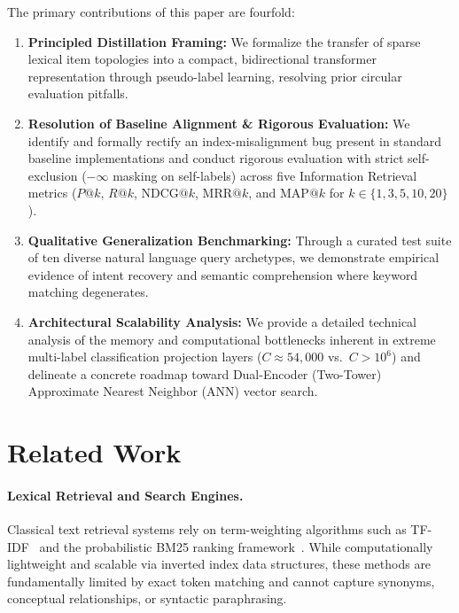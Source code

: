 \documentclass[11pt]{article}
\begin{document}
The primary contributions of this paper are fourfold:
\begin{enumerate}
  \item \textbf{Principled Distillation Framing:} We formalize the transfer of sparse lexical item topologies into a compact, bidirectional transformer representation through pseudo-label learning, resolving prior circular evaluation pitfalls.
  \item \textbf{Resolution of Baseline Alignment \& Rigorous Evaluation:} We identify and formally rectify an index-misalignment bug present in standard baseline implementations and conduct rigorous evaluation with strict self-exclusion ($-\infty$ masking on self-labels) across five Information Retrieval metrics ($P@k$, $R@k$, $\text{NDCG}@k$, $\text{MRR}@k$, and $\text{MAP}@k$ for $k \in \{1, 3, 5, 10, 20\}$).
  \item \textbf{Qualitative Generalization Benchmarking:} Through a curated test suite of ten diverse natural language query archetypes, we demonstrate empirical evidence of intent recovery and semantic comprehension where keyword matching degenerates.
  \item \textbf{Architectural Scalability Analysis:} We provide a detailed technical analysis of the memory and computational bottlenecks inherent in extreme multi-label classification projection layers ($C \approx 54{,}000$ vs.\ $C > 10^6$) and delineate a concrete roadmap toward Dual-Encoder (Two-Tower) Approximate Nearest Neighbor (ANN) vector search.
\end{enumerate}

\section{Related Work}\label{sec:related}

\paragraph{Lexical Retrieval and Search Engines.}
Classical text retrieval systems rely on term-weighting algorithms such as TF-IDF~\cite{tfidf} and the probabilistic BM25 ranking framework~\cite{bm25,manning2008}. While computationally lightweight and scalable via inverted index data structures, these methods are fundamentally limited by exact token matching and cannot capture synonyms, conceptual relationships, or syntactic paraphrasing.
\end{document}
